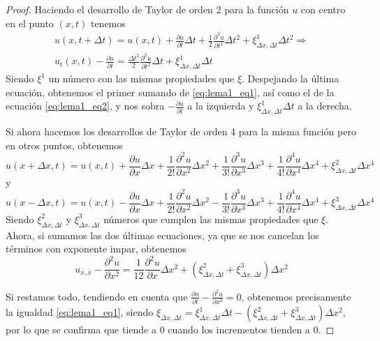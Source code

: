 \begin{proof}
	Haciendo el desarrollo de Taylor de orden 2 para la función $u$ con centro en el punto $(x,t)$ tenemos
	\begin{equation*}
		\begin{split}
		u(x,t+\Delta t)=u(x,t) + \frac{\partial u}{\partial t}\Delta t + \frac{1}{2}\frac{\partial^2u}{\partial t^2}\Delta t^2 + \xi^1_{\Delta x, \Delta t}\Delta t^2 \Rightarrow \\
		u_t(x,t) - \frac{\partial u}{\partial t} = \frac{\Delta t^2}{2}\frac{\partial^2u}{\partial t^2}\Delta t + \xi_{\Delta x, \Delta t}^1\Delta t
		\end{split}
	\end{equation*}
	Siendo $\xi^1$ un número con las mismas propiedades que $\xi$.
	Despejando la última ecuación, obtenemos el primer sumando de \ref{eq:lema1_eq1}, así como el de la ecuación \ref{eq:lema1_eq2}, y nos sobra $- \frac{\partial u}{\partial t}$ a la izquierda y $\xi_{\Delta x, \Delta t}^1\Delta t$ a la derecha.
	
	Si ahora hacemos los desarrollos de Taylor de orden 4 para la misma función pero en otros puntos, obtenemos
	\begin{equation*}
		u(x+\Delta x,t)=u(x,t)+\frac{\partial u}{\partial x}\Delta x+\frac{1}{2!}\frac{\partial^2 u}{\partial x^2}\Delta x^2 + \frac{1}{3!}\frac{\partial^3u}{\partial x^3}\Delta x^3+\frac{1}{4!}\frac{\partial^4u}{\partial x^4}\Delta x^4 + \xi_{\Delta x, \Delta t}^2\Delta x^4
	\end{equation*}
	y
	\begin{equation*}
		u(x-\Delta x,t)=u(x,t)-\frac{\partial u}{\partial x}\Delta x+\frac{1}{2!}\frac{\partial^2 u}{\partial x^2}\Delta x^2 - \frac{1}{3!}\frac{\partial^3u}{\partial x^3}\Delta x^3+\frac{1}{4!}\frac{\partial^4u}{\partial x^4}\Delta x^4 + \xi_{\Delta x, \Delta t}^3\Delta x^4
	\end{equation*}
	Siendo $\xi_{\Delta x, \Delta t}^2$ y $\xi_{\Delta x, \Delta t}^3$ números que cumplen las mismas propiedades que $\xi$.
	Ahora, si sumamos las dos últimas ecuaciones, ya que se nos cancelan los términos con exponente impar, obtenemos
	\begin{equation*}
		u_{x,\bar{x}} - \frac{\partial^2u}{\partial x^2}=\frac{1}{12}\frac{\partial^2u}{\partial x}\Delta x^2 + (\xi_{\Delta x, \Delta t}^2+\xi_{\Delta x, \Delta t}^3)\Delta x^2
	\end{equation*}

	Si restamos todo, tendiendo en cuenta que $\frac{\partial u}{\partial t} - \frac{\partial^2u}{\partial x^2}=0$, obtenemos precisamente la igualdad \ref{eq:lema1_eq1}, siendo $\xi_{\Delta x, \Delta t} = \xi_{\Delta x, \Delta t}^1\Delta t - (\xi_{\Delta x, \Delta t}^2+\xi_{\Delta x, \Delta t}^3)\Delta x^2$, por lo que se confirma que tiende a 0 cuando los incrementos tienden a 0.
\end{proof}

